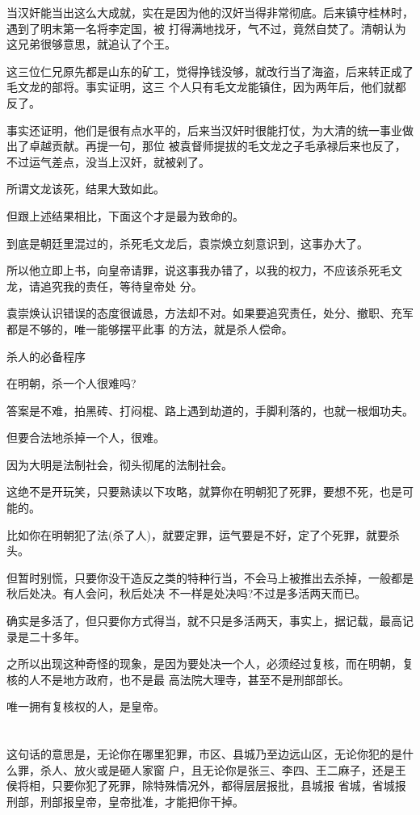\documentclass[11pt,a4paper,onecolumn]{article}
\begin{document}
当汉奸能当出这么大成就，实在是因为他的汉奸当得非常彻底。后来镇守桂林时，遇到了明末第一名将李定国，被
打得满地找牙，气不过，竟然自焚了。清朝认为这兄弟很够意思，就追认了个王。

这三位仁兄原先都是山东的矿工，觉得挣钱没够，就改行当了海盗，后来转正成了毛文龙的部将。事实证明，这三
个人只有毛文龙能镇住，因为两年后，他们就都反了。

事实还证明，他们是很有点水平的，后来当汉奸时很能打仗，为大清的统一事业做出了卓越贡献。再提一句，那位
被袁督师提拔的毛文龙之子毛承禄后来也反了，不过运气差点，没当上汉奸，就被剁了。

所谓文龙该死，结果大致如此。

但跟上述结果相比，下面这个才是最为致命的。

到底是朝廷里混过的，杀死毛文龙后，袁崇焕立刻意识到，这事办大了。

所以他立即上书，向皇帝请罪，说这事我办错了，以我的权力，不应该杀死毛文龙，请追究我的责任，等待皇帝处
分。

袁崇焕认识错误的态度很诚恳，方法却不对。如果要追究责任，处分、撤职、充军都是不够的，唯一能够摆平此事
的方法，就是杀人偿命。

杀人的必备程序

在明朝，杀一个人很难吗?

答案是不难，拍黑砖、打闷棍、路上遇到劫道的，手脚利落的，也就一根烟功夫。

但要合法地杀掉一个人，很难。

因为大明是法制社会，彻头彻尾的法制社会。

这绝不是开玩笑，只要熟读以下攻略，就算你在明朝犯了死罪，要想不死，也是可能的。

比如你在明朝犯了法(杀了人)，就要定罪，运气要是不好，定了个死罪，就要杀头。

但暂时别慌，只要你没干造反之类的特种行当，不会马上被推出去杀掉，一般都是秋后处决。有人会问，秋后处决
不一样是处决吗?不过是多活两天而已。

确实是多活了，但只要你方式得当，就不只是多活两天，事实上，据记载，最高记录是二十多年。

之所以出现这种奇怪的现象，是因为要处决一个人，必须经过复核，而在明朝，复核的人不是地方政府，也不是最
高法院大理寺，甚至不是刑部部长。

唯一拥有复核权的人，是皇帝。

\section[\thesection]{}

这句话的意思是，无论你在哪里犯罪，市区、县城乃至边远山区，无论你犯的是什么罪，杀人、放火或是砸人家窗
户，且无论你是张三、李四、王二麻子，还是王侯将相，只要你犯了死罪，除特殊情况外，都得层层报批，县城报
省城，省城报刑部，刑部报皇帝，皇帝批准，才能把你干掉。
\end{document}
